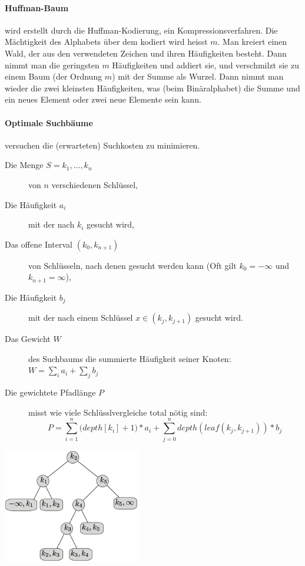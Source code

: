\documentclass[a4paper, 9pt, DIV=20]{scrartcl}
\begin{document}
\paragraph{Huffman-Baum} wird erstellt durch die Huffman-Kodierung, ein Kompressionsverfahren. Die Mächtigkeit des Alphabets über dem kodiert wird heisst $m$. Man kreiert einen Wald, der aus den verwendeten Zeichen und ihren Häufigkeiten besteht. Dann nimmt man die geringsten $m$ Häufigkeiten und addiert sie, und verschmilzt sie zu einem Baum (der Ordnung $m$) mit der Summe als Wurzel. Dann nimmt man wieder die zwei kleinsten Häufigkeiten, was (beim Binäralphabet) die Summe und ein neues Element oder zwei neue Elemente sein kann.

\paragraph{Optimale Suchbäume} versuchen die (erwarteten) Suchkosten zu minimieren.
\begin{description}
\item[Die Menge $S=k_{1}, \dots, k_{n}$] von $n$ verschiedenen Schlüssel,
\item[Die Häufigkeit $a_{i}$] mit der nach $k_{i}$ gesucht wird,
\item[Das offene Interval $(k_{0}, k_{n+1})$] von Schlüsseln, nach denen gesucht werden kann (Oft gilt $k_{0}=-\infty$ und $k_{n+1}=\infty$),
\item[Die Häufigkeit $b_{j}$] mit der nach einem Schlüssel $x\in (k_{j}, k_{j+1})$ gesucht wird.
\item[Das Gewicht $W$] des Suchbaums die summierte Häufigkeit seiner Knoten: $W=\sum_{i}{a_{i}}+\sum_{j}{b_j}$
\item[Die gewichtete Pfadlänge $P$] misst wie viele Schlüsslvergleiche total nötig sind: \[P= \sum^{n}_{i=1}{(depth[k_{i}]+1})*a_{i}+\sum^{n}_{j=0}{depth(leaf(k_{j}, k_{j+1}))*b_{j}}\]
\end{description} 
\begin{center}
\includegraphics[width=6cm]{OptimalerSuchbaum}
\end{center}
\end{document}
